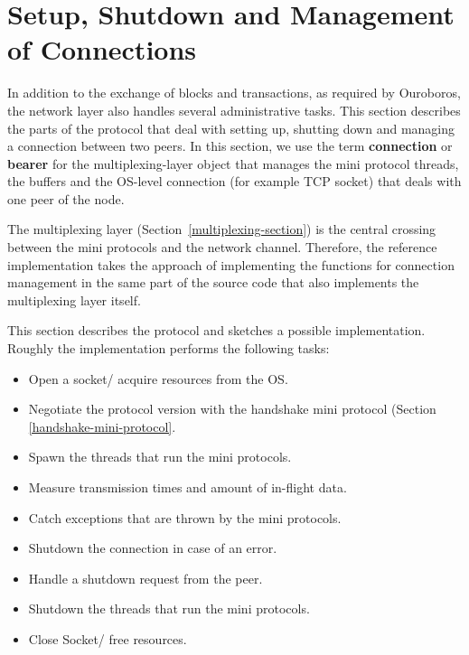 \documentclass{report}
\newcommand{\state}[1]{\texttt{#1}}
\theoremstyle{definition}{
  \newtheorem{lemma}{Lemma}[section] %
  \newtheorem{definition}[lemma]{Definition}
}
\theoremstyle{theorem}{
  \newtheorem{invariant}[lemma]{Invariant}
  \newtheorem{proofobligation}[lemma]{Proof Obligation}
}
\numberwithin{equation}{lemma}
\begin{document}
\section{Setup, Shutdown and Management of Connections}
\label{peer-setup-section}
In addition to the exchange of blocks and transactions, as required by Ouroboros,
the network layer also handles several administrative tasks.
This section describes the parts of the protocol that deal with setting up, shutting down and
managing a connection between two peers.
In this section, we use the term {\bf connection} or {\bf bearer} for the multiplexing-layer object
that manages the mini protocol threads, the buffers and the OS-level connection
(for example TCP socket) that deals with one peer of the node.

The multiplexing layer (Section~\ref{multiplexing-section}) is the central crossing between
the mini protocols and the network channel.
Therefore, the reference implementation takes the approach
of implementing the functions for connection management in the same part of the source code
that also implements the multiplexing layer itself.

This section describes the protocol and sketches a possible implementation.
Roughly the implementation performs the following tasks:
\begin{itemize}
\item Open a socket/ acquire resources from the OS.
\item Negotiate the protocol version with the handshake mini protocol
      (Section \ref{handshake-mini-protocol}.
\item Spawn the threads that run the mini protocols.
\item Measure transmission times and amount of in-flight data.
\item Catch exceptions that are thrown by the mini protocols.
\item Shutdown the connection in case of an error.
\item Handle a shutdown request from the peer.
\item Shutdown the threads that run the mini protocols.
\item Close Socket/ free resources.
\end{itemize}

\newcommand{\Larval}{\state{Larval}}
\newcommand{\Connected}{\state{Connected}}
\newcommand{\Mature}{\state{Mature}}
\newcommand{\Dying}{\state{Dying}}
\newcommand{\Dead}{\state{Dead}}
\end{document}
